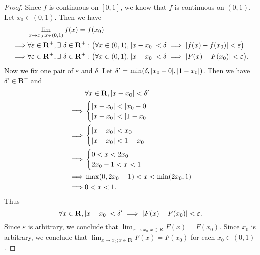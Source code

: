 \begin{proof}
    Since \(f\) is continuous on \([0, 1]\), we know that \(f\) is continuous on \((0, 1)\).
    Let \(x_0 \in (0, 1)\).
    Then we have
    \begin{align*}
                 & \lim_{x \to x_0 ; x \in (0, 1)} f(x) = f(x_0)                                                                                                                                 \\
        \implies & \forall \varepsilon \in \mathbf{R}^+, \exists\ \delta \in \mathbf{R}^+ : \big(\forall x \in (0, 1), \abs*{x - x_0} < \delta \implies \abs*{f(x) - f(x_0)} < \varepsilon\big)  \\
        \implies & \forall \varepsilon \in \mathbf{R}^+, \exists\ \delta \in \mathbf{R}^+ : \big(\forall x \in (0, 1), \abs*{x - x_0} < \delta \implies \abs*{F(x) - F(x_0)} < \varepsilon\big).
    \end{align*}
    Now we fix one pair of \(\varepsilon\) and \(\delta\).
    Let \(\delta' = \min(\delta, \abs*{x_0 - 0}, \abs*{1 - x_0})\).
    Then we have \(\delta' \in \mathbf{R}^+\) and
    \begin{align*}
                 & \forall x \in \mathbf{R}, \abs*{x - x_0} < \delta' \\
        \implies & \begin{cases}
                       \abs*{x - x_0} < \abs*{x_0 - 0} \\
                       \abs*{x - x_0} < \abs*{1 - x_0}
                   \end{cases}                    \\
        \implies & \begin{cases}
                       \abs*{x - x_0} < x_0 \\
                       \abs*{x - x_0} < 1 - x_0
                   \end{cases}                            \\
        \implies & \begin{cases}
                       0 < x < 2x_0 \\
                       2x_0 - 1 < x < 1
                   \end{cases}                                    \\
        \implies & \max(0, 2x_0 - 1) < x < \min(2x_0, 1)              \\
        \implies & 0 < x < 1.
    \end{align*}
    Thus
    \[
        \forall x \in \mathbf{R}, \abs*{x - x_0} < \delta' \implies \abs*{F(x) - F(x_0)} < \varepsilon.
    \]
    Since \(\varepsilon\) is arbitrary, we conclude that \(\lim_{x \to x_0 ; x \in \mathbf{R}} F(x) = F(x_0)\).
    Since \(x_0\) is arbitrary, we conclude that \(\lim_{x \to x_0 ; x \in \mathbf{R}} F(x) = F(x_0)\) for each \(x_0 \in (0, 1)\).


\end{proof}
